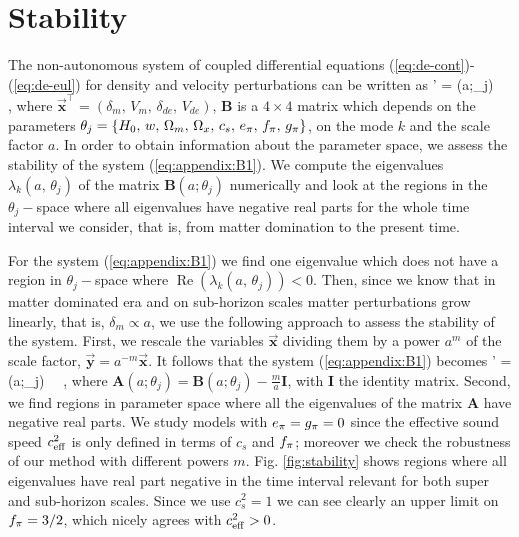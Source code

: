 \chapter{Stability}
\label{appendix1-ade}

The non-autonomous system of coupled differential equations (\ref{eq:de-cont})-(\ref{eq:de-eul}) for density and velocity perturbations can be written as
\be 
{}' = (a;\theta_j) \, \, ,
\label{eq:appendix:B1}
\ee
where $ \vec{\mathbf{x}}^\intercal = (\delta_m,\, V_m,\, \delta_{de},\, V_{de}) $, $ \mathbf{B} $ is a $ 4\times4 $ matrix which depends on the parameters $\theta_j=\lcb H_0,\, w,\, \Omega_m,\, \Omega_x,\,  c_s,\, \aa,\, \ff,\, \gg \rcb$, on the mode $ k $ and the scale factor $ a $. In order to obtain information about the parameter space, we assess the stability of the system (\ref{eq:appendix:B1}). We compute the eigenvalues $ \lambda_k (a,\, \theta_j)$ of the matrix $\mathbf{B}(a;\theta_j)$ numerically and look at the regions in the $\theta_j-$space where all eigenvalues have negative real parts for the whole time interval we consider, that is, from matter domination to the present time. 

For the system (\ref{eq:appendix:B1}) we find one eigenvalue which does not have a region in $\theta_j-$space where $\operatorname{Re} \left( \lambda_k (a,\, \theta_j) \right) < 0$. Then, since we know that in matter dominated era and on sub-horizon scales matter perturbations grow linearly, that is, $ \delta_m \propto a$, we use the following approach to assess the stability of the system. First, we rescale the  variables $ \vec{\mathbf{x}} $ dividing them by a power $ a^m $ of the scale factor, $\vec{\mathbf{y}}=a^{-m}\vec{\mathbf{x}}$. It follows that the system  (\ref{eq:appendix:B1}) becomes   
\be
{}' = (a;\theta_j) \, \, ,
\label{eq:appendix:B2}
\ee
where $ \mathbf{A}(a;\theta_j) = \mathbf{B}(a;\theta_j) - \frac{m}{a} \mathbf{I}  $, with $ \mathbf{I} $ the identity matrix. Second, we find regions in parameter space where all the eigenvalues of the matrix $ \mathbf{A} $ have negative real parts. We study models with $ \aa=\gg=0 $ since the effective sound speed $ \ceff^2 $ is only defined in terms of $ c_s $ and $ \ff $;  moreover we check the robustness of our method with different powers $ m $. Fig. \ref{fig:stability} shows regions where all eigenvalues have real part negative in the time interval relevant for both super and sub-horizon scales.  Since we use $ c_s^2=1 $ we can see clearly an upper limit on $ \ff =3/2$, which nicely agrees with $ \ceff^2>0 $.  

